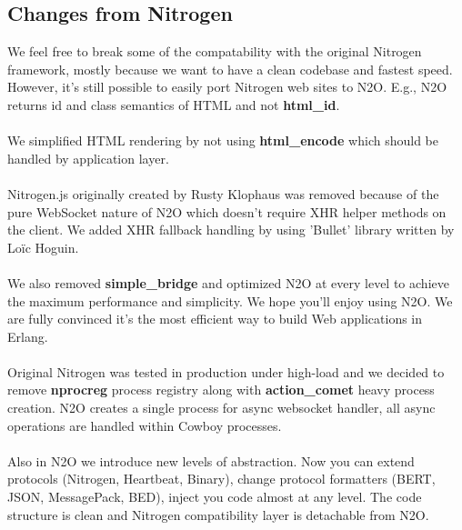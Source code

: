 \subsection*{Changes from Nitrogen}
We feel free to break some of the compatability with the original
Nitrogen framework, mostly because we want to have a clean codebase
and fastest speed. However, it's still possible to easily port
Nitrogen web sites to N2O. E.g., N2O returns id and class semantics
of HTML and not {\bf html\_id}.

\paragraph{}
We simplified HTML rendering by not using
{\bf html\_encode} which should be handled by application layer.

\paragraph{}
Nitrogen.js originally created by Rusty Klophaus
was removed because of the pure WebSocket nature of N2O which doesn't
require XHR helper methods on the client. We added XHR fallback
handling by using 'Bullet' library written by Loïc Hoguin.

\paragraph{}
We also removed {\bf simple\_bridge} and optimized N2O at every level to
achieve the maximum performance and simplicity. We hope you'll enjoy
using N2O. We are fully convinced it's the most efficient way to
build Web applications in Erlang.

\paragraph{}
Original Nitrogen was tested in production under high-load and we
decided to remove {\bf nprocreg} process registry along 
with {\bf{action\_comet}} heavy process creation. N2O creates a single
process for async websocket handler, all async operations
are handled within Cowboy processes.

\paragraph{}
Also in N2O we introduce new levels of abstraction. Now you can extend
protocols (Nitrogen, Heartbeat, Binary), change protocol formatters (BERT,
JSON, MessagePack, BED), inject you code almost at any level. The code structure
is clean and Nitrogen compatibility layer is detachable from N2O.
